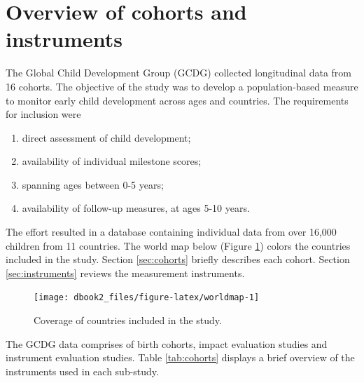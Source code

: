 \documentclass[
]{book}
\providecommand{\tightlist}{%
  \setlength{\itemsep}{0pt}\setlength{\parskip}{0pt}}
\begin{document}
\hypertarget{sec:gcdgoverview}{%
\section{Overview of cohorts and instruments}\label{sec:gcdgoverview}}

The Global Child Development Group (GCDG) collected longitudinal data from 16 cohorts. The objective of the study was to develop a population-based measure to monitor early child development across ages and countries. The requirements for inclusion were

\begin{enumerate}
\def\labelenumi{\arabic{enumi}.}
\tightlist
\item
  direct assessment of child development;
\item
  availability of individual milestone scores;
\item
  spanning ages between 0-5 years;
\item
  availability of follow-up measures, at ages 5-10 years.
\end{enumerate}

The effort resulted in a database containing individual data from over 16,000 children from 11 countries. The world map below (Figure \ref{fig:worldmap}) colors the countries included in the study. Section \ref{sec:cohorts} briefly describes each cohort. Section \ref{sec:instruments} reviews the measurement instruments.

\begin{figure}

{\centering \texttt{[image: dbook2\_files/figure-latex/worldmap-1]} 

}

\caption{Coverage of countries included in the study.}\label{fig:worldmap}
\end{figure}



The GCDG data comprises of birth cohorts, impact evaluation studies and instrument evaluation studies. Table \ref{tab:cohorts} displays a brief overview of the instruments used in each sub-study.

\providecommand{\docline}[3]{\noalign{\global\setlength{\arrayrulewidth}{#1}}\arrayrulecolor[HTML]{#2}\cline{#3}}

\setlength{\tabcolsep}{2pt}

\renewcommand*{\arraystretch}{1.5}
\end{document}
